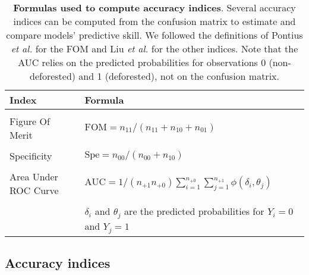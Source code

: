 \documentclass[
  12pt,
]{article}
\begin{document}
\begin{table}[H]

\caption{\label{tab:accuracy-indices}\textbf{Formulas used to compute accuracy indices}. Several accuracy indices can be computed from the confusion matrix to estimate and compare models' predictive skill. We followed the definitions of Pontius \emph{et al.} \citep{Pontius2008} for the FOM and Liu \emph{et al.} \citep{Liu2011} for the other indices. Note that the AUC relies on the predicted probabilities for observations 0 (non-deforested) and 1 (deforested), not on the confusion matrix.\vspace{0.5cm}}
\centering
\begin{tabular}[t]{ll}
\toprule
Index & Formula\\
\midrule
\cellcolor{gray!6}{Overall Accuracy} & \cellcolor{gray!6}{$\text{OA} = (n_{11}+n_{00})/n$}\\
Figure Of Merit & $\text{FOM} = n_{11}/(n_{11}+n_{10}+n_{01})$\\
\cellcolor{gray!6}{Sensitivity} & \cellcolor{gray!6}{$\text{Sen} = n_{11}/(n_{11}+n_{01})$}\\
Specificity & $\text{Spe} = n_{00}/(n_{00}+n_{10})$\\
\cellcolor{gray!6}{True Skill Statistics} & \cellcolor{gray!6}{$\text{TSS} = \text{Sen}+\text{Spe}-1$}\\
Area Under ROC Curve & $\text{AUC} = 1/(n_{+1} n_{+0}) \sum_{i=1}^{n_{+0}} \sum_{j=1}^{n_{+1}} \phi(\delta_i,\theta_j)$\\
\cellcolor{gray!6}{} & \cellcolor{gray!6}{where $\phi(\delta_i,\theta_j)$ equals 1 if $\theta_j>\delta_i$, 1/2 if $\theta_j=\delta_i$, and 0 otherwise}\\
 & $\delta_i$ and $\theta_j$ are the predicted probabilities for $Y_i=0$ and $Y_j=1$\\
\bottomrule
\end{tabular}
\end{table}

\hypertarget{accuracy-indices}{%
\subsection{Accuracy indices}\label{accuracy-indices}}
\end{document}
